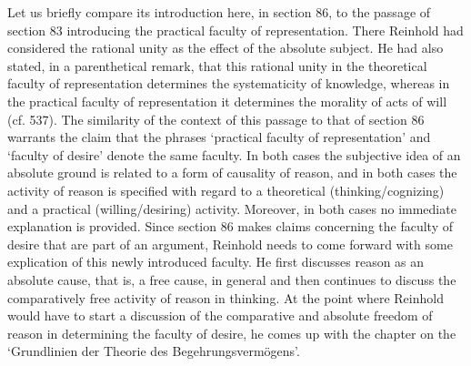 Let us briefly compare its introduction here, in section 86, to the passage of section 83 introducing the practical faculty of representation. There Reinhold had considered the rational unity as the effect of the absolute subject. He had also stated, in a parenthetical remark, that this rational unity in the theoretical faculty of representation determines the systematicity of knowledge, whereas in the practical faculty of representation it determines the morality of acts of will (cf. 537). The similarity of the context of this passage to that of section 86 warrants the claim that the phrases `practical faculty of representation' and `faculty of desire' denote the same faculty. In both cases the subjective idea of an absolute ground is related to a form of causality of reason, and in both cases the activity of reason is specified with regard to a theoretical (thinking/cognizing) and a practical (willing/desiring) activity. Moreover, in both cases no immediate explanation is provided. Since section 86 makes claims concerning the faculty of desire that are part of an argument, Reinhold needs to come forward with some explication of this newly introduced faculty. He first discusses reason as an absolute cause, that is, a free cause, in general and then continues to discuss the comparatively free activity of reason in thinking. At the point where Reinhold would have to start a discussion of the comparative and absolute freedom of reason in determining the faculty of desire, he comes up with the chapter on the `Grundlinien der Theorie des Begehrungsverm\"{o}gens'.

